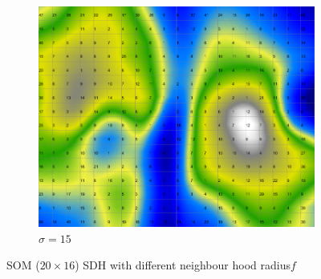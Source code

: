 \documentclass{acm_proc_article-sp}
\begin{document}
\begin{figure}
\begin{subfigure}[b]{0.30\linewidth}
        \includegraphics[width=\linewidth]{img/wine-newmid-smoothed-data-histogram-sigma-15}
        \caption{$\sigma=15$}
    \end{subfigure}
    \caption{SOM ($20\times16$) SDH with different neighbour hood radius$f$}
    \label{fig:wine-newmid-smoothed-data-histogram-sigma}
\end{figure}
\end{document}

